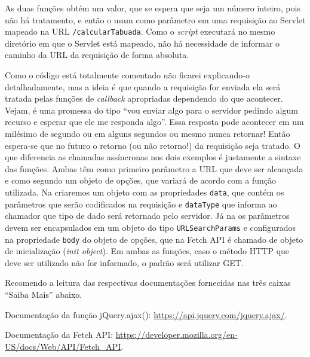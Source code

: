 
As duas funções obtém um valor, que se espera que seja um número inteiro, pois não há tratamento, e então o usam como parâmetro em uma requisição ao Servlet mapeado na URL \texttt{/calcularTabuada}. Como o \textit{script} executará no mesmo diretório em que o Servlet está mapeado, não há necessidade de informar o caminho da URL da requisição de forma absoluta.

Como o código está totalmente comentado não ficarei explicando-o detalhadamente, mas a ideia é que quando a requisição for enviada ela será tratada pelas funções de \textit{callback} apropriadas dependendo do que acontecer. Vejam, é uma promessa do tipo ``vou enviar algo para o servidor pedindo algum recurso e esperar que ele me responda algo''. Essa resposta pode acontecer em um milésimo de segundo ou em alguns segundos ou mesmo nunca retornar! Então espera-se que no futuro o retorno (ou não retorno!) da requisição seja tratado. O que diferencia as chamadas assíncronas nos dois exemplos é justamente a sintaxe das funções. Ambas têm como primeiro parâmetro a URL que deve ser alcançada e como segundo um objeto de opções, que variará de acordo com a função utilizada. Na  criaremos um objeto com as propriedades \texttt{data}, que contém os parâmetros que serão codificados na requisição e \texttt{dataType} que informa ao chamador que tipo de dado será retornado pelo servidor. Já na  os parâmetros devem ser encapsulados em um objeto do tipo \texttt{URLSearchParams} e configurados na propriedade \texttt{body} do objeto de opções, que na Fetch API é chamado de objeto de inicialização (\textit{init object}). Em ambas as funções, caso o método HTTP que deve ser utilizado não for informado, o padrão será utilizar GET.

Recomendo a leitura das respectivas documentações fornecidas nas três caixas ``Saiba Mais'' abaixo.

\begin{saibaMais}
    Documentação da função jQuery.ajax(): \url{https://api.jquery.com/jquery.ajax/}.
\end{saibaMais}

\begin{saibaMais}
    Documentação da Fetch API: \url{https://developer.mozilla.org/en-US/docs/Web/API/Fetch_API}.
\end{saibaMais}


